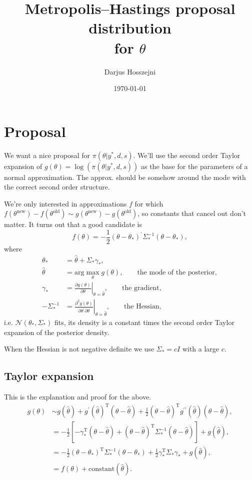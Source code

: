 \documentclass{article}
\title{Metropolis--Hastings proposal distribution\\for $\theta$}
\author{Darjus Hosszejni}
\date{\today}
\begin{document}
\maketitle

\section*{Proposal}

We want a nice proposal for $\pi(\theta\vert y^\ast,d,s)$.
We'll use the second order Taylor expansion of $g(\theta)=\log(\pi(\theta\vert y^\ast,d,s))$ as the base for the parameters of a normal approximation.
The approx. should be somehow around the mode with the correct second order structure.

We're only interested in approximations $f$ for which $f(\theta^\text{new})-f(\theta^\text{old})\sim g(\theta^\text{new})-g(\theta^\text{old})$,
so constants that cancel out don't matter.
It turns out that a good candidate is
\begin{equation*}
f(\theta)=-\frac12(\theta-\theta_\ast)^\prime\Sigma_\ast^{-1}(\theta-\theta_\ast),
\end{equation*}
where
\begin{align*}
\theta_\ast &= \hat\theta+\Sigma_\ast\gamma_\ast, \\
\hat\theta &= \text{arg}\max_\theta g(\theta), \qquad \text{the mode of the posterior}, \\
\gamma_\ast &= \left.\frac{\partial g(\theta)}{\partial\theta}\right\rvert_{\theta=\hat\theta}, \qquad \text{the gradient},\\
-\Sigma_\ast^{-1} &= \left.\frac{\partial^2 g(\theta)}{\partial\theta^\prime\partial\theta}\right\rvert_{\theta=\hat\theta}, \qquad \text{the Hessian},
\end{align*}
i.e. $\mathcal{N}(\theta_\ast,\Sigma_\ast)$ fits, its density is a constant times the second order Taylor expansion of the posterior density.

When the Hessian is not negative definite we use $\Sigma_\ast=cI$ with a large $c$.

\subsection*{Taylor expansion}

This is the explanation and proof for the above.
\begin{align*}
g(\theta) &\sim g\left(\hat\theta\right)+g^\prime\left(\hat\theta\right)^\text{T}\left(\theta-\hat\theta\right)+\frac12\left(\theta-\hat\theta\right)^\text{T}g^{\prime\prime}\left(\hat\theta\right)\left(\theta-\hat\theta\right), \\
&= -\frac12\left[-\gamma_\ast^\text{T}\left(\theta-\hat\theta\right)+\left(\theta-\hat\theta\right)^\text{T}\Sigma_\ast^{-1}\left(\theta-\hat\theta\right)\right]+g\left(\hat\theta\right), \\
&= -\frac12(\theta-\theta_\ast)^\text{T}\Sigma_\ast^{-1}(\theta-\theta_\ast)+\frac12\gamma_\ast^\text{T}\Sigma_\ast\gamma_\ast+g\left(\hat\theta\right), \\
&= f(\theta)+\text{constant}(\hat\theta).
\end{align*}
\end{document}
